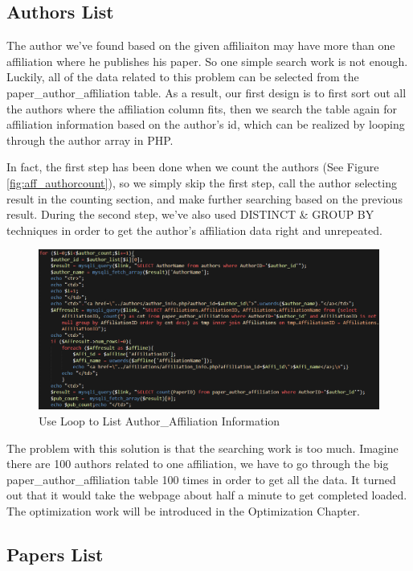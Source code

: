 \documentclass{book}
\begin{document}
\subsection{Authors List}

The author we've found based on the given affiliaiton may have more than one affiliation where he publishes his paper. So one simple search work is not enough. Luckily, all of the data related to this problem can be selected from the paper\_author\_affiliation table. As a result, our first design is to first sort out all the authors where the affiliation column fits, then we search the table again for affiliation information based on the author's id, which can be realized by looping through the author array in PHP.

In fact, the first step has been done when we count the authors (See Figure \ref{fig:aff_authorcount}), so we simply skip the first step, call the author selecting result in the counting section, and make further searching based on the previous result. During the second step, we've also used DISTINCT \& GROUP BY techniques in order to get the author's affiliation data right and unrepeated.

\begin{figure}[H]
\centering
\includegraphics[scale=0.55]{img/zlt_aff_authorloop.png}
\caption{Use Loop to List Author\_Affiliation Information}
\end{figure}

The problem with this solution is that the searching work is too much. Imagine there are 100 authors related to one affiliation, we have to go through the big paper\_author\_affiliation table 100 times in order to get all the data. It turned out that it would take the webpage about half a minute to get completed loaded. The optimization work will be introduced in the Optimization Chapter.

\subsection{Papers List}
\end{document}
